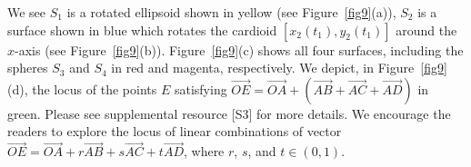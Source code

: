 \documentclass[12pt,a4paper]{article}%
\begin{document}
We see $S_{1}$ is a rotated ellipsoid shown in yellow (see Figure~\ref{fig9}(a)),
$S_{2}$ is a surface shown in blue which rotates
the cardioid $[x_{2}(t_{1}), y_{2}(t_{1})]$ around the $x$-axis (see Figure~\ref{fig9}(b)).
Figure~\ref{fig9}(c) shows all four surfaces, including the spheres $S_{3}$
and $S_{4}$ in red and magenta, respectively.
We depict, in Figure~\ref{fig9}(d), the locus of the points $E$ satisfying
$\overrightarrow{OE}=\overrightarrow{OA}+\left(\overrightarrow{AB}+\overrightarrow{AC}+\overrightarrow{AD}\right)$
in green.
Please see supplemental resource [S3] for more details.
We encourage the readers to explore the locus of linear combinations of vector
$\overrightarrow{OE}=\overrightarrow{OA}+r\overrightarrow{AB}
                                +s\overrightarrow{AC}+t\overrightarrow{AD}$,
where $r$, $s$, and $t\in\left(  0,1\right)$.
\end{document}
